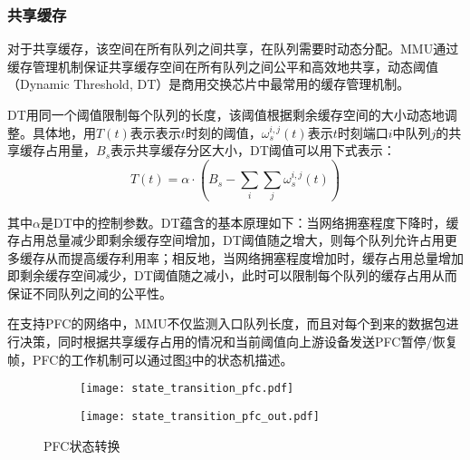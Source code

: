 \subsubsection{共享缓存}

对于共享缓存，该空间在所有队列之间共享，在队列需要时动态分配。MMU通过缓存管理机制保证共享缓存空间在所有队列之间公平和高效地共享，动态阈值（Dynamic Threshold, DT）是商用交换芯片中最常用的缓存管理机制\cite{SIGCOMM16RDMA,SIGCOMM19HPCC,broadcom2012smartbuffer,ExtremeBuffer,Arista7050X3,BCM88800TM,MellanoxDT,CiscoNexus9000ConfigGuide,BS19Yahoo}。

DT用同一个阈值限制每个队列的长度，该阈值根据剩余缓存空间的大小动态地调整。具体地，用$T(t)$表示表示$t$时刻的阈值，$\omega_s^{i,j}(t)$表示$t$时刻端口$i$中队列$j$的共享缓存占用量，$B_s$表示共享缓存分区大小，DT阈值可以用下式表示：
\begin{equation}
  T(t)=\alpha \cdot (B_s - \sum_{i} \sum_{j} \omega_s^{i,j}(t))
  \label{eqn:c3:dt threshold}
\end{equation}

其中$\alpha$是DT中的控制参数。DT蕴含的基本原理如下：当网络拥塞程度下降时，缓存占用总量减少即剩余缓存空间增加，DT阈值随之增大，则每个队列允许占用更多缓存从而提高缓存利用率；相反地，当网络拥塞程度增加时，缓存占用总量增加即剩余缓存空间减少，DT阈值随之减小，此时可以限制每个队列的缓存占用从而保证不同队列之间的公平性。

\label{c3:s1:ss2:flow control}

在支持PFC的网络中，MMU不仅监测入口队列长度，而且对每个到来的数据包进行决策，同时根据共享缓存占用的情况和当前阈值向上游设备发送PFC暂停/恢复帧，PFC的工作机制可以通过图\ref{c3:s1:ss2:fig:pfc state transition}中的状态机描述。

\begin{figure}[H]
  \begin{subfigure}[b]{0.49\linewidth}
      \centering
      \texttt{[image: state\_transition\_pfc.pdf]}
      \label{c3:s1:ss2:fig:sub1:ingress}
  \end{subfigure}
  \begin{subfigure}[b]{0.49\linewidth}
      \centering
      \texttt{[image: state\_transition\_pfc\_out.pdf]}
      \label{c3:s1:ss2:fig:sub2:egress}
  \end{subfigure}
  \caption{PFC状态转换}
  \label{c3:s1:ss2:fig:pfc state transition}
\end{figure}

